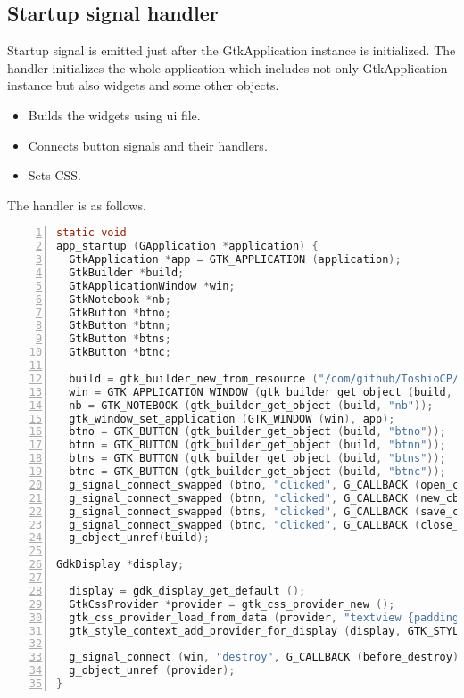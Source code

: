 \subsection{Startup signal handler}\label{startup-signal-handler}

Startup signal is emitted just after the GtkApplication instance is
initialized. The handler initializes the whole application which
includes not only GtkApplication instance but also widgets and some
other objects.

\begin{itemize}
\tightlist
\item
  Builds the widgets using ui file.
\item
  Connects button signals and their handlers.
\item
  Sets CSS.
\end{itemize}

The handler is as follows.

\begin{lstlisting}[language=C, numbers=left]
static void
app_startup (GApplication *application) {
  GtkApplication *app = GTK_APPLICATION (application);
  GtkBuilder *build;
  GtkApplicationWindow *win;
  GtkNotebook *nb;
  GtkButton *btno;
  GtkButton *btnn;
  GtkButton *btns;
  GtkButton *btnc;

  build = gtk_builder_new_from_resource ("/com/github/ToshioCP/tfe/tfe.ui");
  win = GTK_APPLICATION_WINDOW (gtk_builder_get_object (build, "win"));
  nb = GTK_NOTEBOOK (gtk_builder_get_object (build, "nb"));
  gtk_window_set_application (GTK_WINDOW (win), app);
  btno = GTK_BUTTON (gtk_builder_get_object (build, "btno"));
  btnn = GTK_BUTTON (gtk_builder_get_object (build, "btnn"));
  btns = GTK_BUTTON (gtk_builder_get_object (build, "btns"));
  btnc = GTK_BUTTON (gtk_builder_get_object (build, "btnc"));
  g_signal_connect_swapped (btno, "clicked", G_CALLBACK (open_cb), nb);
  g_signal_connect_swapped (btnn, "clicked", G_CALLBACK (new_cb), nb);
  g_signal_connect_swapped (btns, "clicked", G_CALLBACK (save_cb), nb);
  g_signal_connect_swapped (btnc, "clicked", G_CALLBACK (close_cb), nb);
  g_object_unref(build);

GdkDisplay *display;

  display = gdk_display_get_default ();
  GtkCssProvider *provider = gtk_css_provider_new ();
  gtk_css_provider_load_from_data (provider, "textview {padding: 10px; font-family: monospace; font-size: 12pt;}", -1);
  gtk_style_context_add_provider_for_display (display, GTK_STYLE_PROVIDER (provider), GTK_STYLE_PROVIDER_PRIORITY_APPLICATION);

  g_signal_connect (win, "destroy", G_CALLBACK (before_destroy), provider);
  g_object_unref (provider);
}
\end{lstlisting}

